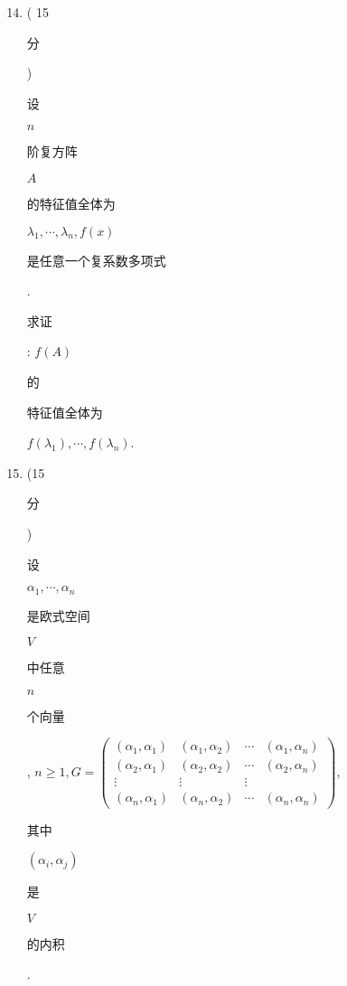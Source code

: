 \documentclass[10pt]{article}
\begin{document}
\begin{enumerate}
  \setcounter{enumi}{13}
  \item ( 15 \begin{CJK}{UTF8}{mj}分\end{CJK}) \begin{CJK}{UTF8}{mj}设\end{CJK} $n$ \begin{CJK}{UTF8}{mj}阶复方阵\end{CJK} $A$ \begin{CJK}{UTF8}{mj}的特征值全体为\end{CJK} $\lambda_{1}, \cdots, \lambda_{n}, f(x)$ \begin{CJK}{UTF8}{mj}是任意一个复系数多项式\end{CJK}. \begin{CJK}{UTF8}{mj}求证\end{CJK}: $f(A)$ \begin{CJK}{UTF8}{mj}的\end{CJK} \begin{CJK}{UTF8}{mj}特征值全体为\end{CJK} $f\left(\lambda_{1}\right), \cdots, f\left(\lambda_{n}\right)$.

  \item (15 \begin{CJK}{UTF8}{mj}分\end{CJK}) \begin{CJK}{UTF8}{mj}设\end{CJK} $\alpha_{1}, \cdots, \alpha_{n}$ \begin{CJK}{UTF8}{mj}是欧式空间\end{CJK} $V$ \begin{CJK}{UTF8}{mj}中任意\end{CJK} $n$ \begin{CJK}{UTF8}{mj}个向量\end{CJK}, $n \geqslant 1, G=\left(\begin{array}{cccc}\left(\alpha_{1}, \alpha_{1}\right) & \left(\alpha_{1}, \alpha_{2}\right) & \cdots & \left(\alpha_{1}, \alpha_{n}\right) \\ \left(\alpha_{2}, \alpha_{1}\right) & \left(\alpha_{2}, \alpha_{2}\right) & \cdots & \left(\alpha_{2}, \alpha_{n}\right) \\ \vdots & \vdots & \vdots \\ \left(\alpha_{n}, \alpha_{1}\right) & \left(\alpha_{n}, \alpha_{2}\right) & \cdots & \left(\alpha_{n}, \alpha_{n}\right)\end{array}\right)$, \begin{CJK}{UTF8}{mj}其中\end{CJK} $\left(\alpha_{i}, \alpha_{j}\right)$ \begin{CJK}{UTF8}{mj}是\end{CJK} $V$ \begin{CJK}{UTF8}{mj}的内积\end{CJK}.

\end{enumerate}
\end{document}
